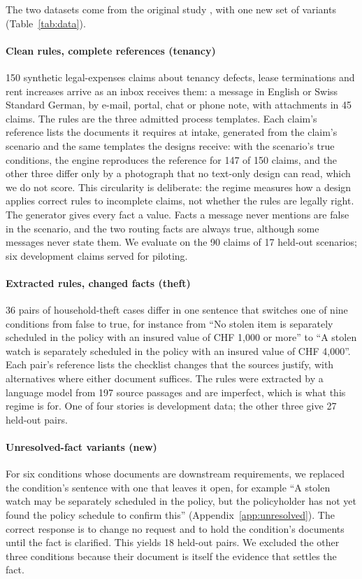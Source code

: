 The two datasets come from the original \casepath study \cite{casepath2026repo}, with one new set of variants (Table~\ref{tab:data}).

\paragraph{Clean rules, complete references (tenancy)}
150 synthetic legal-expenses claims about tenancy defects, lease terminations and rent increases arrive as an inbox receives them: a message in English or Swiss Standard German, by e-mail, portal, chat or phone note, with attachments in 45 claims. The rules are the three admitted process templates. Each claim's reference lists the documents it requires at intake, generated from the claim's scenario and the same templates the designs receive: with the scenario's true conditions, the \casepath engine reproduces the reference for 147 of 150 claims, and the other three differ only by a photograph that no text-only design can read, which we do not score. This circularity is deliberate: the regime measures how a design applies correct rules to incomplete claims, not whether the rules are legally right. The generator gives every fact a value. Facts a message never mentions are false in the scenario, and the two routing facts are always true, although some messages never state them. We evaluate on the 90 claims of 17 held-out scenarios; six development claims served for piloting.

\paragraph{Extracted rules, changed facts (theft)}
36 pairs of household-theft cases differ in one sentence that switches one of nine conditions from false to true, for instance from ``No stolen item is separately scheduled in the policy with an insured value of CHF 1,000 or more'' to ``A stolen watch is separately scheduled in the policy with an insured value of CHF 4,000''. Each pair's reference lists the checklist changes that the sources justify, with alternatives where either document suffices. The rules were extracted by a language model from 197 source passages and are imperfect, which is what this regime is for. One of four stories is development data; the other three give 27 held-out pairs.

\paragraph{Unresolved-fact variants (new)}
For six conditions whose documents are downstream requirements, we replaced the condition's sentence with one that leaves it open, for example ``A stolen watch may be separately scheduled in the policy, but the policyholder has not yet found the policy schedule to confirm this'' (Appendix~\ref{app:unresolved}). The correct response is to change no request and to hold the condition's documents until the fact is clarified. This yields 18 held-out pairs. We excluded the other three conditions because their document is itself the evidence that settles the fact.

